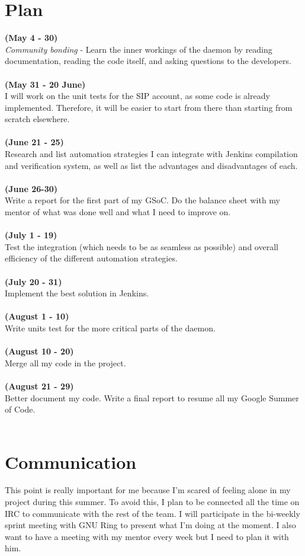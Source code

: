 \documentclass{article}
\begin{document}
\section{Plan}
\textbf{(May 4 - 30)}\\
\textit{Community bonding} - Learn the inner workings of the daemon by reading documentation, reading the code itself, and asking questions to the developers.\\ \\
\textbf{(May 31 - 20 June)} \\ I will work on the unit tests for the SIP account, as some code is already implemented. Therefore, it will be easier to start from there than starting from scratch elsewhere.\\ \\
\textbf{(June 21 - 25)} \\ Research and list automation strategies I can integrate with Jenkins compilation and verification system, as well as list the advantages and disadvantages of each. \\ \\
\textbf{(June 26-30)}\\ Write a report for the first part of my GSoC. Do the balance sheet with my mentor of what was done well  and what I need to improve on. \\ \\
\textbf{(July 1 - 19)}\\ Test the integration (which  needs to be as seamless as possible) and overall efficiency of the different automation strategies. \\ \\
\textbf{(July 20 - 31)}\\ Implement the best solution in Jenkins. \\ \\
\textbf{(August 1 - 10)}\\ Write units test for the more critical parts of the daemon. \\ \\
\textbf{(August 10 - 20)}\\ Merge all my code in the project. \\ \\
\textbf{(August 21 - 29)}\\ Better document my code. Write a final report to resume all my Google Summer of Code. \\ \\

\section{Communication}
This point is really important for me because I’m scared of feeling alone in my project during this summer. To avoid this, I plan to be connected all the time on IRC to communicate with the rest of the team. I will participate in  the bi-weekly sprint meeting with GNU Ring to present what I’m doing at the moment. I also want to have a meeting with my mentor every week but I need to plan it with him.
\end{document}
